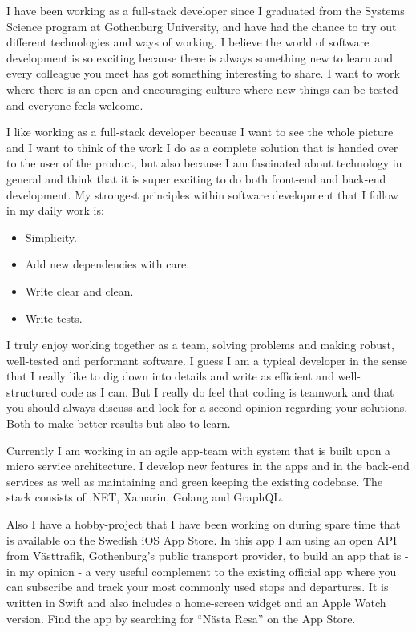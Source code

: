 

I have been working as a full-stack developer since I graduated from the Systems Science program at
Gothenburg University, and have had the chance to try out different technologies and ways
of working. I believe the world of software development is so exciting because there is always something new
to learn and every colleague you meet has got something interesting to share. I want to work where there is an
open and encouraging culture where new things can be tested and everyone feels welcome.

I like working as a full-stack developer because I want to see the whole picture and I want to think of the work
I do as a complete solution that is handed over to the user of the product, but also because I am
fascinated about technology in general and think that it is super exciting to do both front-end and
back-end development. My strongest principles within software development that I follow in my daily work is:

\begin{itemize}
  \item Simplicity.
  \item Add new dependencies with care.
  \item Write clear and clean.
  \item Write tests.
\end{itemize}

I truly enjoy working together as a team, solving problems and making robust, well-tested and
performant software. I guess I am a typical developer in the sense that I really like
to dig down into details and write as efficient and well-structured code as I can. But I really do feel that coding
is teamwork and that you should always discuss and look for a second opinion regarding your solutions.
Both to make better results but also to learn.

Currently I am working in an agile app-team with system that is built upon a micro service architecture.
I develop new features in the apps and in the back-end services as well as maintaining and green keeping the existing codebase.
The stack consists of .NET, Xamarin, Golang and GraphQL.

Also I have a hobby-project that I have been working on during spare time that is available
on the Swedish iOS App Store. In this app I am using an open API from Västtrafik, Gothenburg’s public
transport provider, to build an app that is - in my opinion - a very useful complement to the
existing official app where you can subscribe and track your most commonly used stops and departures.
It is written in Swift and also includes a home-screen widget and an Apple Watch version. Find
the app by searching for “Nästa Resa” on the App Store.

